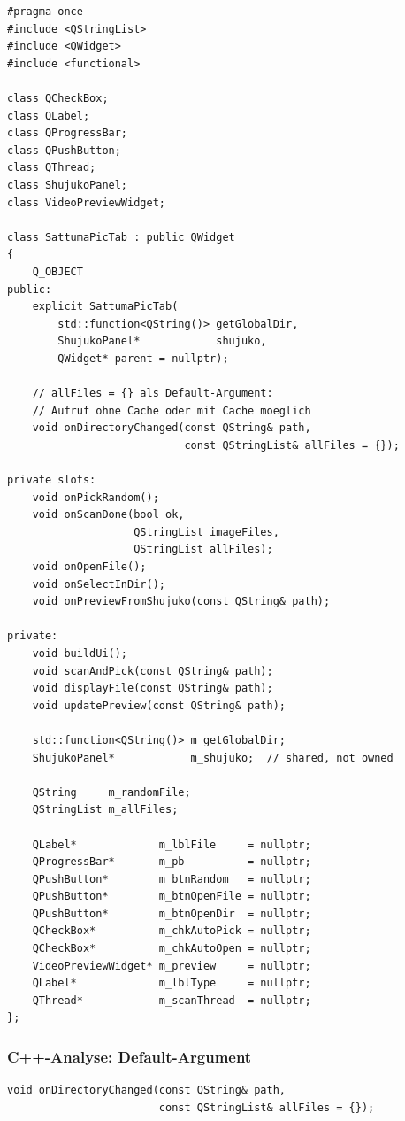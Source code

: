\begin{lstlisting}[style=header, caption={sattumapictab.h}]
#pragma once
#include <QStringList>
#include <QWidget>
#include <functional>

class QCheckBox;
class QLabel;
class QProgressBar;
class QPushButton;
class QThread;
class ShujukoPanel;
class VideoPreviewWidget;

class SattumaPicTab : public QWidget
{
    Q_OBJECT
public:
    explicit SattumaPicTab(
        std::function<QString()> getGlobalDir,
        ShujukoPanel*            shujuko,
        QWidget* parent = nullptr);

    // allFiles = {} als Default-Argument:
    // Aufruf ohne Cache oder mit Cache moeglich
    void onDirectoryChanged(const QString& path,
                            const QStringList& allFiles = {});

private slots:
    void onPickRandom();
    void onScanDone(bool ok,
                    QStringList imageFiles,
                    QStringList allFiles);
    void onOpenFile();
    void onSelectInDir();
    void onPreviewFromShujuko(const QString& path);

private:
    void buildUi();
    void scanAndPick(const QString& path);
    void displayFile(const QString& path);
    void updatePreview(const QString& path);

    std::function<QString()> m_getGlobalDir;
    ShujukoPanel*            m_shujuko;  // shared, not owned

    QString     m_randomFile;
    QStringList m_allFiles;

    QLabel*             m_lblFile     = nullptr;
    QProgressBar*       m_pb          = nullptr;
    QPushButton*        m_btnRandom   = nullptr;
    QPushButton*        m_btnOpenFile = nullptr;
    QPushButton*        m_btnOpenDir  = nullptr;
    QCheckBox*          m_chkAutoPick = nullptr;
    QCheckBox*          m_chkAutoOpen = nullptr;
    VideoPreviewWidget* m_preview     = nullptr;
    QLabel*             m_lblType     = nullptr;
    QThread*            m_scanThread  = nullptr;
};
\end{lstlisting}

\subsubsection{C++-Analyse: Default-Argument}

\begin{lstlisting}
void onDirectoryChanged(const QString& path,
                        const QStringList& allFiles = {});
\end{lstlisting}

